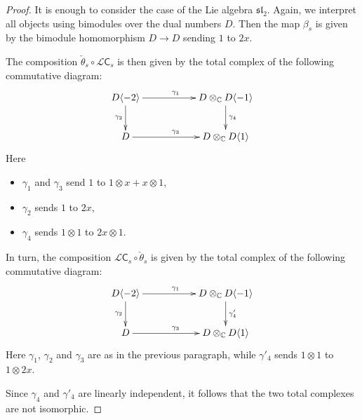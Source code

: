 \documentclass[a4paper]{amsart}
\begin{document}
\begin{proof}
It is enough to consider the case of the Lie algebra $\mathfrak{sl}_2$.
Again, we interpret all objects using bimodules over the dual numbers $D$.
Then the map $\beta_s$ is given by the bimodule homomorphism
$D\to D$ sending $1$ to $2x$. 

The composition $\check{\theta}_s\circ\mathcal{L}\mathsf{C}_s$ is then
given by the total complex of the following commutative diagram:
\begin{displaymath}
\xymatrix{
D\langle -2\rangle\ar[rr]^{\gamma_1}\ar[d]_{\gamma_2}&&
D\otimes_{\mathbb{C}}D\langle -1\rangle\ar[d]^{\gamma_4}\\
D\ar[rr]^{\gamma_3} &&D\otimes_{\mathbb{C}}D\langle 1\rangle\\
}
\end{displaymath}
Here
\begin{itemize}
\item $\gamma_1$ and $\gamma_3$ send $1$ to $1\otimes x+x\otimes 1$,
\item $\gamma_2$ sends $1$ to $2x$,
\item $\gamma_4$ sends $1\otimes 1$ to $2x\otimes 1$. 
\end{itemize}

In turn, the composition $\mathcal{L}\mathsf{C}_s\circ\check{\theta}_s$ is
given by the total complex of the following commutative diagram:
\begin{displaymath}
\xymatrix{
D\langle -2\rangle\ar[rr]^{\gamma_1}\ar[d]_{\gamma_2}&&
D\otimes_{\mathbb{C}}D\langle -1\rangle\ar[d]^{\gamma'_4}\\
D\ar[rr]^{\gamma_3} &&D\otimes_{\mathbb{C}}D\langle 1\rangle\\
}
\end{displaymath}
Here $\gamma_1$, $\gamma_2$ and $\gamma_3$ are as in the previous paragraph,
while $\gamma'_4$ sends $1\otimes 1$ to $1\otimes 2x$.

Since $\gamma_4$ and  $\gamma'_4$ are linearly independent, it follows that the
two total complexes are not isomorphic.
\end{proof}
\end{document}
